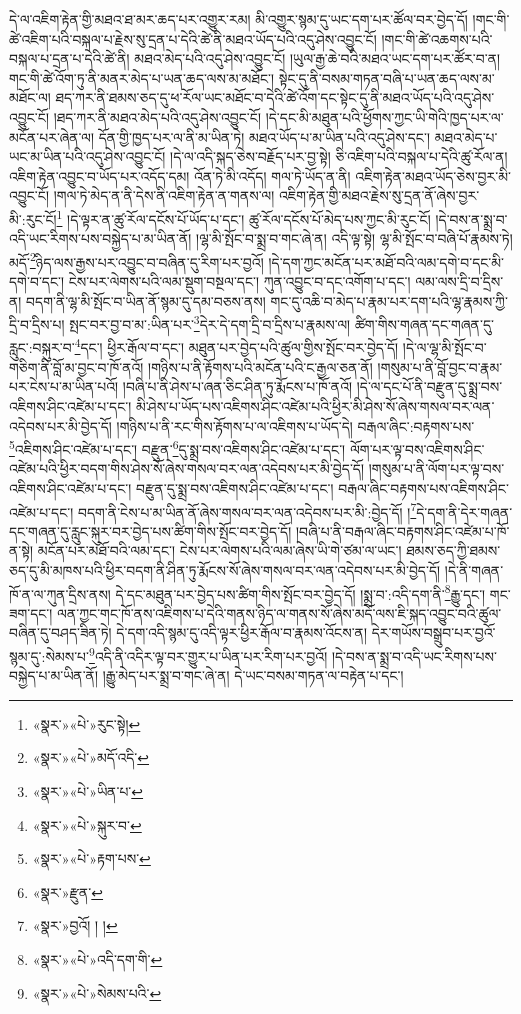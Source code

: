 དེ་ལ་འཇིག་རྟེན་གྱི་མཐའ་ཐ་མར་ཆད་པར་འགྱུར་རམ། མི་འགྱུར་སྙམ་དུ་ཡང་དག་པར་ཚོལ་བར་བྱེད་དོ། །གང་གི་ཚེ་འཇིག་པའི་བསྐལ་པ་རྗེས་སུ་དྲན་པ་དེའི་ཚེ་ནི་མཐའ་ཡོད་པའི་འདུ་ཤེས་འབྱུང་ངོ། །གང་གི་ཚེ་འཆགས་པའི་བསྐལ་པ་དྲན་པ་དེའི་ཚེ་ནི། མཐའ་མེད་པའི་འདུ་ཤེས་འབྱུང་ངོ། །ཡུལ་རྒྱ་ཆེ་བའི་མཐའ་ཡང་དག་པར་ཚོར་བ་ན། གང་གི་ཚེ་འོག་ཏུ་ནི་མནར་མེད་པ་ཡན་ཆད་ལས་མ་མཐོང་། སྟེང་དུ་ནི་བསམ་གཏན་བཞི་པ་ཡན་ཆད་ལས་མ་མཐོང་ལ། ཐད་ཀར་ནི་ཐམས་ཅད་དུ་ཕ་རོལ་ཡང་མཐོང་བ་དེའི་ཚེ་འོག་དང་སྟེང་དུ་ནི་མཐའ་ཡོད་པའི་འདུ་ཤེས་འབྱུང་ངོ། །ཐད་ཀར་ནི་མཐའ་མེད་པའི་འདུ་ཤེས་འབྱུང་ངོ། །དེ་དང་མི་མཐུན་པའི་ཕྱོགས་ཀྱང་ཡི་གེའི་ཁྱད་པར་ལ་མངོན་པར་ཞེན་ལ། དོན་གྱི་ཁྱད་པར་ལ་ནི་མ་ཡིན་ཏེ། མཐའ་ཡོད་པ་མ་ཡིན་པའི་འདུ་ཤེས་དང་། མཐའ་མེད་པ་ཡང་མ་ཡིན་པའི་འདུ་ཤེས་འབྱུང་ངོ། །དེ་ལ་འདི་སྐད་ཅེས་བརྗོད་པར་བྱ་སྟེ། ཅི་འཇིག་པའི་བསྐལ་པ་དེའི་ཚུ་རོལ་ན། འཇིག་རྟེན་འབྱུང་བ་ཡོད་པར་འདོད་དམ། འོན་ཏེ་མི་འདོད། གལ་ཏེ་ཡོད་ན་ནི། འཇིག་རྟེན་མཐའ་ཡོད་ཅེས་བྱར་མི་འབྱུང་ངོ། །གལ་ཏེ་མེད་ན་ནི་དེས་ནི་འཇིག་རྟེན་ན་གནས་ལ། འཇིག་རྟེན་གྱི་མཐའ་རྗེས་སུ་དྲན་ནོ་ཞེས་བྱར་མི་:རུང་ངོ།\footnote{«སྣར་»«པེ་»རུང་སྟེ།} །དེ་ལྟར་ན་ཚུ་རོལ་དངོས་པོ་ཡོད་པ་དང་། ཚུ་རོལ་དངོས་པོ་མེད་པས་ཀྱང་མི་རུང་ངོ། །དེ་བས་ན་སྨྲ་བ་འདི་ཡང་རིགས་པས་བསྐྱེད་པ་མ་ཡིན་ནོ། །ལྷ་མི་སྤོང་བ་སྨྲ་བ་གང་ཞེ་ན། འདི་ལྟ་སྟེ། ལྷ་མི་སྤོང་བ་བཞི་པོ་རྣམས་ཏེ། མདོ་\footnote{«སྣར་»«པེ་»མདོ་འདི་}ཉིད་ལས་རྒྱས་པར་འབྱུང་བ་བཞིན་དུ་རིག་པར་བྱའོ། །དེ་དག་ཀྱང་མངོན་པར་མཐོ་བའི་ལམ་དགེ་བ་དང་མི་དགེ་བ་དང་། ངེས་པར་ལེགས་པའི་ལམ་སྡུག་བསྔལ་དང་། ཀུན་འབྱུང་བ་དང་འགོག་པ་དང་། ལམ་ལས་དྲི་བ་དྲིས་ན། བདག་ནི་ལྷ་མི་སྤོང་བ་ཡིན་ནོ་སྙམ་དུ་དམ་བཅས་ནས། གང་དུ་འཆི་བ་མེད་པ་རྣམ་པར་དག་པའི་ལྷ་རྣམས་ཀྱི་དྲི་བ་དྲིས་པ། སྤང་བར་བྱ་བ་མ་:ཡིན་པར་\footnote{«སྣར་»«པེ་»ཡིན་པ་}དེར་དེ་དག་དྲི་བ་དྲིས་པ་རྣམས་ལ། ཚིག་གིས་གཞན་དང་གཞན་དུ་རླུང་:བསྐུར་བ་\footnote{«སྣར་»«པེ་»སྐུར་བ་}དང་། ཕྱིར་རྒོལ་བ་དང་། མཐུན་པར་བྱེད་པའི་ཚུལ་གྱིས་སྤོང་བར་བྱེད་དོ། །དེ་ལ་ལྷ་མི་སྤོང་བ་གཅིག་ནི་བློ་མ་བྱང་བ་ཁོ་ནའོ། །གཉིས་པ་ནི་རྟོགས་པའི་མངོན་པའི་ང་རྒྱལ་ཅན་ནོ། །གསུམ་པ་ནི་བློ་བྱང་བ་རྣམ་པར་ངེས་པ་མ་ཡིན་པའོ། །བཞི་པ་ནི་ཤེས་པ་ཞན་ཅིང་ཤིན་ཏུ་རྨོངས་པ་ཁོ་ནའོ། །དེ་ལ་དང་པོ་ནི་བརྫུན་དུ་སྨྲ་བས་འཇིགས་ཤིང་འཛེམ་པ་དང་། མི་ཤེས་པ་ཡོད་པས་འཇིགས་ཤིང་འཛེམ་པའི་ཕྱིར་མི་ཤེས་སོ་ཞེས་གསལ་བར་ལན་འདེབས་པར་མི་བྱེད་དོ། །གཉིས་པ་ནི་རང་གིས་རྟོགས་པ་ལ་འཇིགས་པ་ཡོད་དེ། བརྒལ་ཞིང་:བརྟགས་པས་\footnote{«སྣར་»«པེ་»རྟག་པས་}འཇིགས་ཤིང་འཛེམ་པ་དང་། བརྫུན་\footnote{«སྣར་»རྫུན་}དུ་སྨྲ་བས་འཇིགས་ཤིང་འཛེམ་པ་དང་། ལོག་པར་ལྟ་བས་འཇིགས་ཤིང་འཛེམ་པའི་ཕྱིར་བདག་གིས་ཤེས་སོ་ཞེས་གསལ་བར་ལན་འདེབས་པར་མི་བྱེད་དོ། །གསུམ་པ་ནི་ལོག་པར་ལྟ་བས་འཇིགས་ཤིང་འཛེམ་པ་དང་། བརྫུན་དུ་སྨྲ་བས་འཇིགས་ཤིང་འཛེམ་པ་དང་། བརྒལ་ཞིང་བརྟགས་པས་འཇིགས་ཤིང་འཛེམ་པ་དང་། བདག་ནི་ངེས་པ་མ་ཡིན་ནོ་ཞེས་གསལ་བར་ལན་འདེབས་པར་མི་:བྱེད་དོ། །\footnote{«སྣར་»བྱའོ། ། །}དེ་དག་ནི་དེར་གཞན་དང་གཞན་དུ་རླུང་སྐུར་བར་བྱེད་པས་ཚིག་གིས་སྤོང་བར་བྱེད་དོ། །བཞི་པ་ནི་བརྒལ་ཞིང་བརྟགས་ཤིང་འཛེམ་པ་ཁོ་ན་སྟེ། མངོན་པར་མཐོ་བའི་ལམ་དང་། ངེས་པར་ལེགས་པའི་ལམ་ཞེས་ཡི་གེ་ཙམ་ལ་ཡང་། ཐམས་ཅད་ཀྱི་ཐམས་ཅད་དུ་མི་མཁས་པའི་ཕྱིར་བདག་ནི་ཤིན་ཏུ་རྨོངས་སོ་ཞེས་གསལ་བར་ལན་འདེབས་པར་མི་བྱེད་དོ། །དེ་ནི་གཞན་ཁོ་ན་ལ་ཀུན་དྲིས་ནས། དེ་དང་མཐུན་པར་བྱེད་པས་ཚིག་གིས་སྤོང་བར་བྱེད་དོ། །སྨྲ་བ་:འདི་དག་ནི་\footnote{«སྣར་»«པེ་»འདི་དག་གི་}རྒྱུ་དང་། གང་ཟག་དང་། ལན་ཀྱང་གང་ཁོ་ནས་འཇིགས་པ་དེའི་གནས་ཉིད་ལ་གནས་སོ་ཞེས་མདོ་ལས་ཇི་སྐད་འབྱུང་བའི་ཚུལ་བཞིན་དུ་བཤད་ཟིན་ཏེ། དེ་དག་འདི་སྙམ་དུ་འདི་ལྟར་ཕྱིར་རྒོལ་བ་རྣམས་འོངས་ན། དེར་གཡོས་བསྒྲུབ་པར་བྱའོ་སྙམ་དུ་:སེམས་པ་\footnote{«སྣར་»«པེ་»སེམས་པའི་}འདི་ནི་འདིར་ལྟ་བར་གྱུར་པ་ཡིན་པར་རིག་པར་བྱའོ། །དེ་བས་ན་སྨྲ་བ་འདི་ཡང་རིགས་པས་བསྐྱེད་པ་མ་ཡིན་ནོ། །རྒྱུ་མེད་པར་སྨྲ་བ་གང་ཞེ་ན། དེ་ཡང་བསམ་གཏན་ལ་བརྟེན་པ་དང་། 